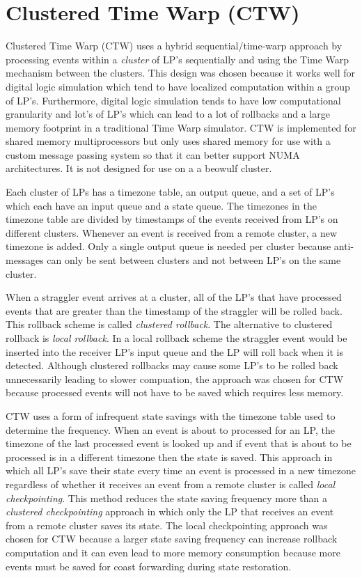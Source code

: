 \documentclass[11pt]{book}
\begin{document}
\section{Clustered Time Warp (CTW)}

Clustered Time Warp\cite{avril-95} (CTW) uses a hybrid sequential/time-warp approach by processing
events within a \emph{cluster} of LP's sequentially and using the Time Warp mechanism between
the clusters. This design was chosen because it works well for digital logic simulation which tend
to have localized computation within a group of LP's. Furthermore, digital logic simulation tends
to have low computational granularity and lot's of LP's which can lead to a lot of rollbacks
and a large memory footprint in a traditional Time Warp simulator. CTW is implemented for
shared memory multiprocessors but only uses shared memory for use with a custom message passing
system so that it can better support NUMA architectures. It is not designed for use on a
a beowulf cluster.

Each cluster of LPs has a timezone table, an output queue, and a set of LP's which each have an
input queue and a state queue. The timezones in the timezone table are divided by timestamps
of the events received from LP's on different clusters. Whenever an event is received from
a remote cluster, a new timezone is added. Only a single output queue is needed per cluster
because anti-messages can only be sent between clusters and not between LP's on the same
cluster.

When a straggler event arrives at a cluster, all of the LP's that have processed events that
are greater than the timestamp of the straggler will be rolled back. This rollback scheme is
called \emph{clustered rollback}. The alternative to clustered rollback is \emph{local
rollback}. In a local rollback scheme the straggler event would be inserted into the receiver
LP's input queue and the LP will roll back when it is detected. Although clustered rollbacks
may cause some LP's to be rolled back unnecessarily leading to slower compuation, the
approach was chosen for CTW because processed events will not have to be saved which
requires less memory.

CTW uses a form of infrequent state savings with the timezone table used to determine the
frequency. When an event is about to processed for an LP, the timezone of the last processed
event is looked up and if event that is about to be processed is in a different timezone then
the state is saved. This approach in which all LP's save their state every time an event is
processed in a new timezone regardless of whether it receives an event from a remote cluster
is called \emph{local checkpointing}. This method reduces the state saving frequency more
than a \emph{clustered checkpointing} approach in which only the LP that receives an event
from a remote cluster saves its state. The local checkpointing approach was chosen for CTW
because a larger state saving frequency can increase rollback computation and it can even
lead to more memory consumption because more events must be saved for coast forwarding
during state restoration.
\end{document}
